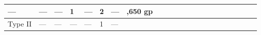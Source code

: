 \begin{longtable}{llllllllllllllllllllll}
{\begin{minipage}[t]{0.054in}
---\end{minipage}} & \multicolumn{1}{p{0.054in}|}{\begin{minipage}[t]{0.054in}\raggedright
---\end{minipage}} & \multicolumn{1}{p{0.054in}|}{\begin{minipage}[t]{0.054in}\raggedright
---\end{minipage}} & \multicolumn{1}{p{0.054in}|}{\begin{minipage}[t]{0.054in}\raggedright
1\end{minipage}} & \multicolumn{1}{p{0.054in}|}{\begin{minipage}[t]{0.054in}\raggedright
---\end{minipage}} & \multicolumn{1}{p{0.054in}|}{\begin{minipage}[t]{0.054in}\raggedright
2\end{minipage}} & \multicolumn{1}{p{0.054in}|}{\begin{minipage}[t]{0.054in}\raggedright
---\end{minipage}} & \multicolumn{1}{p{0.054in}|}{\begin{minipage}[t]{0.054in}\raggedleft
1,650 gp\end{minipage}}\\
\hline
\multicolumn{1}{|p{0.534in}|}{\begin{minipage}[t]{0.534in}\raggedleft
Type II\end{minipage}} & \multicolumn{1}{p{0.341in}|}{\begin{minipage}[t]{0.341in}\centering
---\end{minipage}} & \multicolumn{1}{p{0.287in}|}{\begin{minipage}[t]{0.287in}\raggedright
---\end{minipage}} & \multicolumn{1}{p{0.287in}|}{\begin{minipage}[t]{0.287in}\raggedright
---\end{minipage}} & \multicolumn{1}{p{0.287in}|}{\begin{minipage}[t]{0.287in}\raggedright
---\end{minipage}} & \multicolumn{1}{p{0.287in}|}{\begin{minipage}[t]{0.287in}\raggedright
1\end{minipage}} & \multicolumn{1}{p{0.287in}|}{\begin{minipage}[t]{0.287in}\raggedright
---\end{minipage}} & \multicolumn{1}{p{0.287in}|}{\begin{minipage}[t]{0.287in}\raggedright

\end{minipage}}
\end{longtable}
